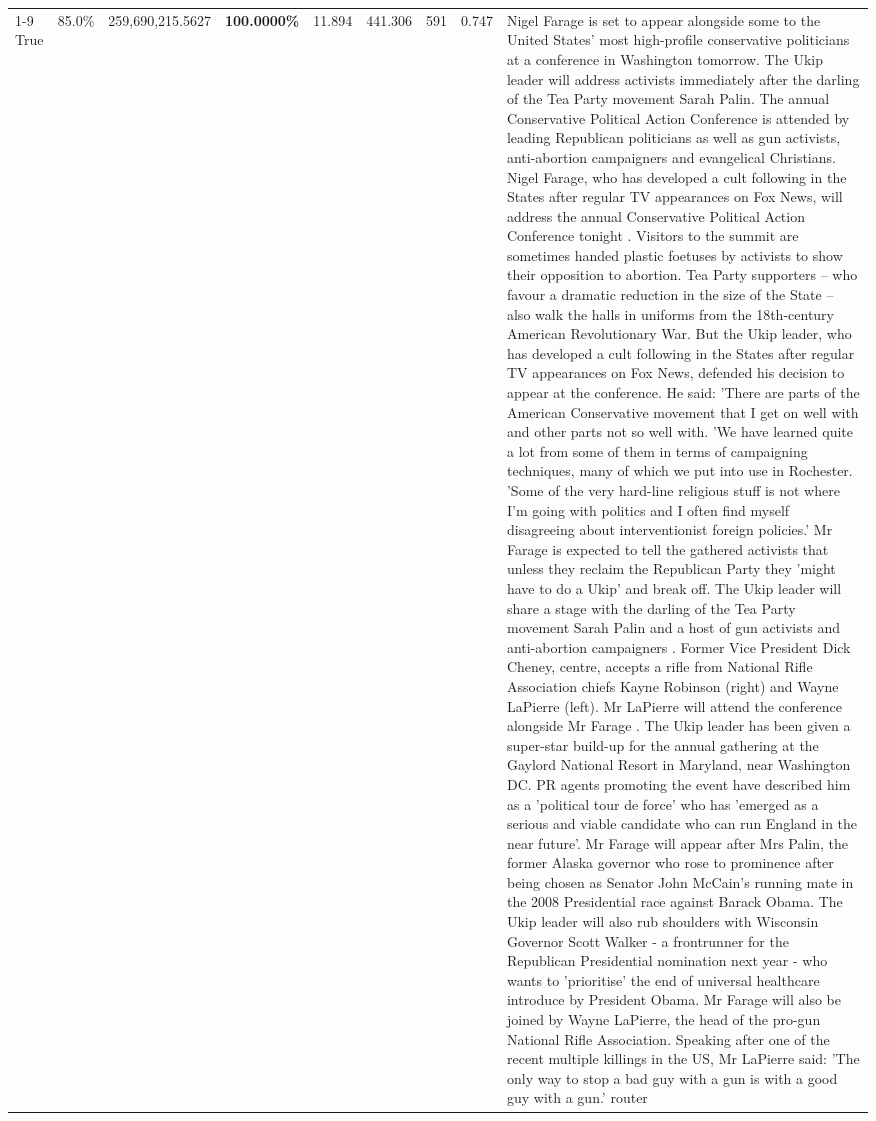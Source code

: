 \begin{table}[H]
\begin{tabular}{lllrlllll}
\cline{1-9}
True & 85.0\% & 259,690,215.5627 & \bfseries \color{red} 100.0000\% & 11.894 & 441.306 & 591 & 0.747 & Nigel Farage is set to appear alongside some to the United States' most high-profile conservative politicians at a conference in Washington tomorrow. The Ukip leader will address activists immediately after the darling of the Tea Party movement Sarah Palin. The annual Conservative Political Action Conference is attended by leading Republican politicians as well as gun activists, anti-abortion campaigners and evangelical Christians. Nigel Farage, who has developed a cult following in the States after regular TV appearances on Fox News, will address the annual Conservative Political Action Conference tonight . Visitors to the summit are sometimes handed plastic foetuses by activists to show their opposition to abortion. Tea Party supporters – who favour a dramatic reduction in the size of the State – also walk the halls in uniforms from the 18th-century American Revolutionary War. But the Ukip leader, who has developed a cult following in the States after regular TV appearances on Fox News, defended his decision to appear at the conference. He said: 'There are parts of the American Conservative movement that I get on well with and other parts not so well with. 'We have learned quite a lot from some of them in terms of campaigning techniques, many of which we put into use in Rochester. 'Some of the very hard-line religious stuff is not where I'm going with politics and I often find myself disagreeing about interventionist foreign policies.' Mr Farage is expected to tell the gathered activists that unless they reclaim the Republican Party they 'might have to do a Ukip' and break off. The Ukip leader will share a stage with the darling of the Tea Party movement Sarah Palin and a host of gun activists and anti-abortion campaigners . Former Vice President Dick Cheney, centre, accepts a rifle from National Rifle Association chiefs Kayne Robinson (right) and Wayne LaPierre (left). Mr LaPierre will attend the conference alongside Mr Farage . The Ukip leader has been given a super-star build-up for the annual gathering at the Gaylord National Resort in Maryland, near Washington DC. PR agents promoting the event have described him as a 'political tour de force' who has 'emerged as a serious and viable candidate who can run England in the near future'. Mr Farage will appear after Mrs Palin, the former Alaska governor who rose to prominence after being chosen as Senator John McCain's running mate in the 2008 Presidential race against Barack Obama. The Ukip leader will also rub shoulders with Wisconsin Governor Scott Walker - a frontrunner for the Republican Presidential nomination next year - who wants to 'prioritise' the end of universal healthcare introduce by President Obama. Mr Farage will also be joined by Wayne LaPierre, the head of the pro-gun National Rifle Association. Speaking after one of the recent multiple killings in the US, Mr LaPierre said: 'The only way to stop a bad guy with a gun is with a good guy with a gun.' router \\

\end{tabular}
\end{table}
